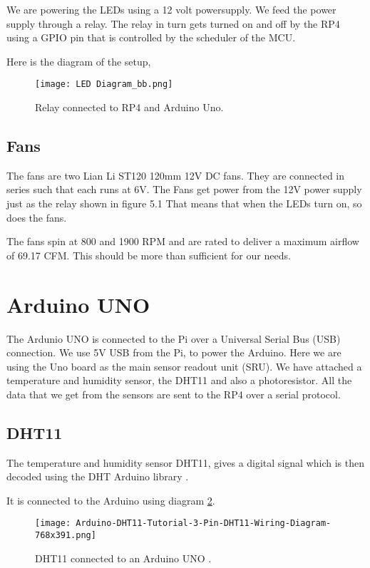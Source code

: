 \documentclass[12pt,a4paper,oneside]{book}
\begin{document}
We are powering the LEDs using a 12 volt powersupply. We feed the power supply through a relay. The relay in turn gets turned on and off by the RP4 using a GPIO pin that is controlled by the scheduler of the MCU.

\bigskip

Here is the diagram of the setup,

\begin{figure}[h]
    \texttt{[image: LED Diagram\_bb.png]}
    \caption{Relay connected to RP4 and Arduino Uno.}
    \label{LED_diagram}
\end{figure}

\subsection{Fans}
The fans are two Lian Li ST120 120mm 12V DC fans. They are connected in series such that each runs at 6V.
The Fans get power from the 12V power supply just as the relay shown in figure 5.1
That means that when the LEDs turn on, so does the fans.

The fans spin at 800 and 1900 RPM and are rated to deliver a maximum airflow of 69.17 CFM. This should be more than sufficient for our needs.

\section{Arduino UNO}
The Ardunio UNO is connected to the Pi over a Universal Serial Bus (USB) connection.
We use 5V USB from the Pi, to power the Arduino. Here we are using the Uno board as the main sensor readout unit (SRU). We have attached a temperature and humidity sensor, the DHT11 and also a photoresistor. All the data that we get from the sensors are sent to the RP4 over a serial protocol.

\subsection{DHT11}
The temperature and humidity sensor DHT11, gives a digital signal which is then decoded using the DHT Arduino library \cite{dht}.

It is connected to the Arduino using diagram \ref{diagram1}.

\begin{figure}[h]
    \texttt{[image: Arduino-DHT11-Tutorial-3-Pin-DHT11-Wiring-Diagram-768x391.png]}
    \caption{DHT11 connected to an Arduino UNO \cite{dht}.}
    \label{diagram1}
\end{figure}
\end{document}
